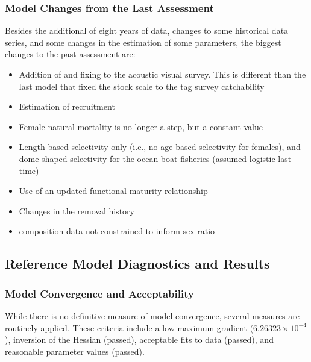 \documentclass[11pt,
  letterpaper,
]{article}
\providecommand{\tightlist}{%
  \setlength{\itemsep}{0pt}\setlength{\parskip}{0pt}}
\providecommand{\tightlist}{%
  \setlength{\itemsep}{0pt}\setlength{\parskip}{0pt}}
\begin{document}
\hypertarget{model-changes-from-the-last-assessment}{%
\subsubsection{Model Changes from the Last Assessment}\label{model-changes-from-the-last-assessment}}

Besides the additional of eight years of data, changes to some historical data series, and some changes in the estimation of some parameters, the biggest changes to the past assessment are:

\begin{itemize}
\tightlist
\item
  Addition of and fixing to the acoustic visual survey. This is different than the last model that fixed the stock scale to the tag survey catchability
\item
  Estimation of recruitment
\item
  Female natural mortality is no longer a step, but a constant value
\item
  Length-based selectivity only (i.e., no age-based selectivity for females), and dome-shaped selectivity for the ocean boat fisheries (assumed logistic last time)
\item
  Use of an updated functional maturity relationship
\item
  Changes in the removal history
\item
  composition data not constrained to inform sex ratio
\end{itemize}

\hypertarget{reference-model-diagnostics-and-results}{%
\subsection{Reference Model Diagnostics and Results}\label{reference-model-diagnostics-and-results}}

\hypertarget{model-convergence-and-acceptability}{%
\subsubsection{Model Convergence and Acceptability}\label{model-convergence-and-acceptability}}

While there is no definitive measure of model convergence, several measures are routinely applied. These criteria include a low maximum gradient (\ensuremath{6.26323\times 10^{-4}}), inversion of the Hessian (passed), acceptable fits to data (passed), and reasonable parameter values (passed).
\end{document}
